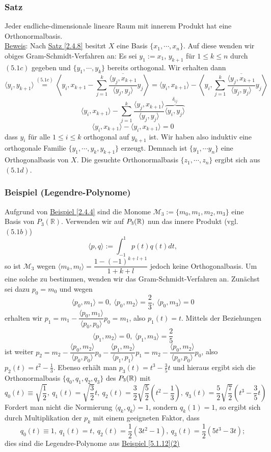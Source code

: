 \subsubsection{Satz}
\label{5.1.15}
Jeder endliche-dimensionale lineare Raum mit innerem Produkt hat eine Orthonormalbasis.\\
\underline{Beweis}: Nach \hyperref[2.4.8]{Satz \ref{2.4.8}} besitzt $X$ eine Basis $\{x_1,\cdots ,x_n\}$.  Auf diese wenden wir obiges Gram-Schmidt-Verfahren an: Es sei $y_1:=x_1$, $y_{k+1}$ für $1\leq k\leq n$ durch \hyperref[5.1c]{$(5.1c)$} gegeben und $\{y_1,\cdots ,y_k\}$ bereits orthogonal.  Wir erhalten dann
\[\langle y_i,y_{k+1}\rangle \stackrel{\hyperref[5.1c]{(5.1c)}}{=}\left\langle y_i,x_{k+1}-\sum _{j=1}^k\frac{\overline{\langle y_j,x_{k+1}}}{\langle y_j,y_j\rangle}y_j\right\rangle = \langle y_i,x_{k+1}\rangle - \left\langle y_i,\sum _{j=1}^k \frac{\overline{\langle y_j,x_{k+1}}}{\langle y_j,y_j\rangle}y_j\right\rangle\]
\[\langle y_i,x_{k+1}\rangle -\sum _{j=1}^k\frac{\langle y_j,x_{k+1}\rangle}{\langle y_j,y_j\rangle}\overbrace{\langle y_i,y_j\rangle}^{\delta_{ij}}\]
\[\langle y_i,x_{k+1}\rangle -\langle y_i,x_{k+1}\rangle = 0\]
dass $y_i$ für alle $1\leq i\leq k$ orthogonal auf $y_{k+1}$ ist.  Wir haben also induktiv eine orthogonale Familie $\{y_1,\cdots ,y_k,y_{k+1}\}$ erzeugt.  Demnach ist $\{y_1,\cdots y_n\}$ eine Orthogonalbasis von $X$.  Die gesuchte Orthonormalbasis $\{z_1,\cdots ,z_n\}$ ergibt sich aus \hyperref[5.1d]{$(5.1d)$}.
\subsubsection{Beispiel (Legendre-Polynome)}
Aufgrund von \hyperref[2.4.4]{Beispiel \ref{2.4.4}} sind die Monome $\mathcal{M}_3:=\{m_0,m_1,m_2,m_3\}$ eine Basis von $P_3(\mathbb{R})$.  Verwenden wir auf $P_3(\mathbb{R})$ nun das innere Produkt (vgl. \hyperref[5.1b]{$(5.1b)$})
\[\langle p,q\rangle := \int _{-1}^1 p(t)q(t)dt,\]
so ist $\mathcal{M}_3$ wegen $\langle m_k,m_l\rangle = \dfrac{1-(-1)^{k+l+1}}{1+k+l}$ jedoch keine Orthogonalbasis.  Um eine solche zu bestimmen, wenden wir das Gram-Schmidt-Verfahren an.  Zunächst sei dazu $p_0=m_0$ und wegen
\[\langle p_0,m_1\rangle = 0,\ \langle p_0,m_2\rangle = \frac{2}{3},\ \langle p_0,m_3\rangle = 0\]
erhalten wir $p_1=m_1-\dfrac{\langle p_0,m_1\rangle}{\langle p_0,p_0\rangle}p_0=m_1$, also $p_1(t)=t$.  Mittels der Beziehungen
\[\langle p_1,m_2\rangle =0,\ \langle p_1,m_3\rangle =\frac{2}{5}\]
ist weiter $p_2=m_2-\dfrac{\langle p_0,m_2\rangle}{\langle p_0,p_0\rangle}p_0-\dfrac{\langle p_1,m_2\rangle}{\langle p_1,p_1\rangle}p_1=m_2-\dfrac{\langle p_0,m_2\rangle}{\langle p_0,p_0\rangle}p_0$, also $p_2(t)=t^2-\frac{1}{3}$.  Ebenso erhält man $p_3(t)=t^3-\frac{3}{5}t$ und hieraus ergibt sich die Orthonormalbasis $\{q_0,q_1,q_2,q_3\}$ des $P_3(\mathbb{R})$ mit
\[q_0(t)\equiv\sqrt{\frac{1}{2}},\ q_1(t)=\sqrt{\frac{3}{2}}t,\ q_2(t)=\frac{3}{2}\sqrt{\frac{5}{2}}(t^2-\frac{1}{3}),\ q_3(t)=\frac{5}{2}\sqrt{\frac{7}{2}}(t^3-\frac{3}{5}t)\]
Fordert man nicht die Normierung $\langle q_k,q_k\rangle = 1$, sondern $q_k(1)=1$, so ergibt sich durch Multiplikation der $p_k$ mit einem geeigneten Faktor, dass
\[q_0(t)\equiv 1,\ q_1(t)=t,\ q_2(t)=\frac{1}{2}(3t^2-1),\ q_3(t)=\frac{1}{2}(5t^3-3t);\]
dies sind die Legendre-Polynome aus \hyperref[5.1.12]{Beispiel \ref{5.1.12}(2)}
